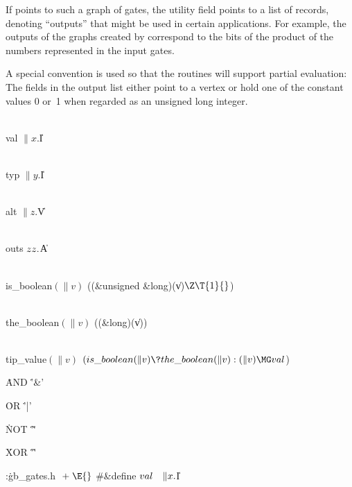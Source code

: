 If  points to such a graph of gates, the utility field  points to
a list of  records, denoting ``outputs'' that might be used in
certain applications. For example, the outputs of the graphs
created by  correspond to the bits of the product of the numbers
represented in the input gates.

A special convention is used so that the routines will support partial
evaluation: The  fields in the output list either point to a
vertex or hold one of the constant values 0 or~1 when regarded as an
unsigned long integer.

\Y\B\4\D\\{val}\5
$\|x.{}$\|I\par
\B\4\D\\{typ}\5
$\|y.{}$\|I\par
\B\4\D\\{alt}\5
$\|z.{}$\|V\par
\B\4\D\\{outs}\5
$\\{zz}.{}$\|A\par
\B\4\D\\{is\_boolean}$(\|v)$\5
((\&{unsigned} \&{long})(\|v)${}\Z\T{1}{}$)\par
\B\4\D\\{the\_boolean}$(\|v)$\5
((\&{long})(\|v))\par
\B\4\D\\{tip\_value}$(\|v)$\5
$(\\{is\_boolean}(\|v)\?\\{the\_boolean}(\|v):(\|v)\MG\\{val}{}$)\par
\B\4\D\.{AND}\5
\.{'\&'}\par
\B\4\D\.{OR}\5
\.{'|'}\par
\B\4\D\.{NOT}\5
\.{'\~'}\par
\B\4\D\.{XOR}\5
\.{'\^'}\par
\Y\B\4:\.{gb\_gates.h }\X${}\mathrel+\E{}$\6
\8\#\&{define} ${}\\{val}\hbox{\quad}\|x.{}$\|I\6
